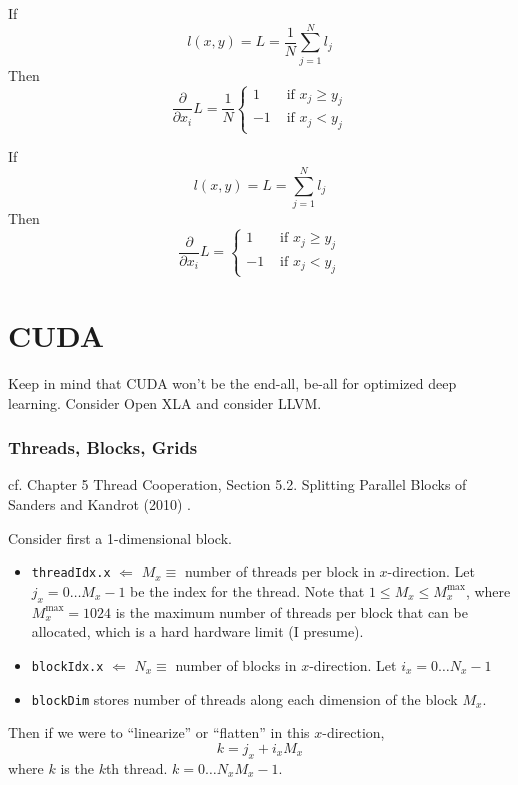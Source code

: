 \documentclass[10pt]{amsart}
\begin{document}
\begin{multicols*}{2}
If 
\[
l(x,y) = L = \frac{1}{N} \sum_{j=1}^N l_j 
\]
Then
\[
\frac{\partial }{ \partial x_i} L = \frac{1}{N} \begin{cases} 1 & \text{ if } x_j \geq y_j \\
	-1 & \text{ if } x_j < y_j \end{cases}
\]

If 
\[
l(x,y) = L =  \sum_{j=1}^N l_j 
\]
Then
\[
\frac{\partial }{ \partial x_i} L =  \begin{cases} 1 & \text{ if } x_j \geq y_j \\
	-1 & \text{ if } x_j < y_j \end{cases}
\]

\part{CUDA}

Keep in mind that CUDA won't be the end-all, be-all for optimized deep learning. Consider Open XLA and consider LLVM.

\section{Threads, Blocks, Grids}

cf. Chapter 5 Thread Cooperation, Section 5.2. Splitting Parallel Blocks of Sanders and Kandrot (2010) \cite{SK2010}.

Consider first a 1-dimensional block.

\begin{itemize}
	\item \verb|threadIdx.x| $\Longleftarrow$ $M_x \equiv $ number of threads per block in $x$-direction.  Let $j_x = 0 \dots M_x-1$ be the index for the thread.  Note that $1 \leq M_x \leq M_x^{\text{max}}$, where $M_x^{\text{max}} = 1024$ is the maximum number of threads per block that can be allocated, which is a hard hardware limit (I presume). 
	\item \verb|blockIdx.x| $\Longleftarrow$ $N_x \equiv $ number of blocks in $x$-direction.  Let $i_x = 0\dots N_x-1$
	\item \verb|blockDim| stores number of threads along each dimension of the block $M_x$.  
\end{itemize}

Then if we were to ``linearize'' or ``flatten'' in this $x$-direction,
\begin{equation}\label{Eq:GlobalIndexCUDA1Dim}
k = j_x + i_x M_x
\end{equation}
where $k$ is the $k$th thread.  $k=0\dots N_xM_x -1$.


\end{multicols*}
\end{document}
